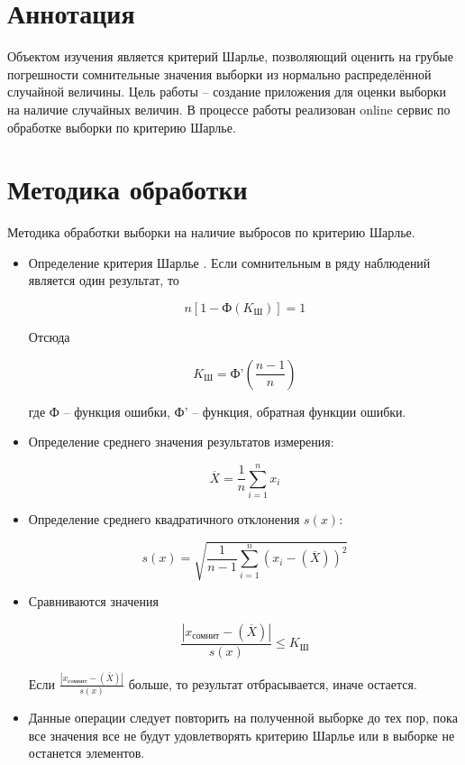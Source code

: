 \documentclass[a4paper,14pt]{article}
\begin{document}


\section{Аннотация}

Объектом изучения является критерий Шарлье, позволяющий оценить на грубые погрешности сомнительные значения выборки из нормально распределённой случайной величины. Цель работы -- создание приложения для оценки выборки на наличие случайных величин. В процессе работы реализован online сервис по обработке выборки по критерию Шарлье.


\section{Методика обработки}

Методика обработки выборки на наличие выбросов по критерию Шарлье.
\begin{itemize}
	\item Определение критерия Шарлье \cite{krSh}. Если сомнительным в ряду наблюдений является один результат, то
	
	$$n[1 - \text{Ф}(K_{\text{Ш}})] = 1$$
	
	Отсюда 
	
	$$K_{\text{Ш}} =  \text{Ф'}(\frac{n-1}{n})$$
	
	где  $\text{Ф}$ -- функция ошибки, $\text{Ф'}$ -- функция, обратная функции ошибки.
	
	\item Определение среднего значения результатов измерения:
	
	$$\overline{X} = \dfrac{1}{n}\sum_{i=1}^{n}x_i$$
	
	\item Определение среднего квадратичного отклонения $s(x)$:
	
	$$s(x)= \sqrt{\dfrac{1}{n-1}\sum_{i=1}^{n}(x_i - (\overline X))^2}$$
	
	\item Сравниваются значения \cite{zalaznih}
	
	$$\frac{|x_{\text{сомнит}} - (\overline X)|}{ s(x)} \leqslant K_{\text{Ш}}$$
	
	Если $\frac{|x_{\text{сомнит}} - (\overline X)|}{ s(x)}$ больше, то результат отбрасывается, иначе остается.
	
	\item Данные операции следует повторить на полученной выборке до тех пор, пока все значения все не будут удовлетворять критерию Шарлье или в выборке не останется элементов.
\end{itemize}
\end{document}
